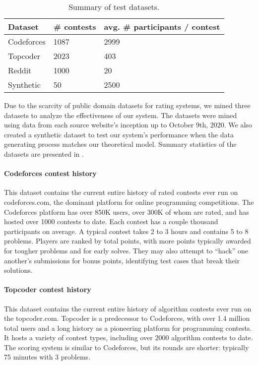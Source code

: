 \begin{table}[t]
\begin{tabular}{l|l|l}
\hline
\textbf{Dataset} & \textbf{\# contests} & \textbf{avg. \# participants / contest} \\ \hline
Codeforces       & 1087                & 2999                                     \\ %
Topcoder         & 2023                & 403                                   \\ %
Reddit           & 1000                & 20                                       \\
Synthetic        & 50                  & 2500     \\ \hline
\end{tabular}
    \caption{Summary of test datasets.}
    \label{tab:dataset-summary}
    \vspace{-1.2em}
\end{table}

Due to the scarcity of public domain datasets for rating systems, we mined three datasets to analyze the effectiveness of our system. The datasets were mined using data from each source website's inception up to October 9th, 2020. We also created a synthetic dataset to test our system's performance when the data generating process matches our theoretical model. Summary statistics of the datasets are presented in .

\paragraph{Codeforces contest history}
This dataset contains the current entire history of rated contests ever run on codeforces.com, the dominant platform for online programming competitions. The Codeforces platform has over 850K users, over 300K of whom are rated, and has hosted over 1000 contests to date. Each contest has a couple thousand participants on average. A typical contest takes 2 to 3 hours and contains 5 to 8 problems. Players are ranked by total points, with more points typically awarded for tougher problems and for early solves. They may also attempt to ``hack'' one another's submissions for bonus points, identifying test cases that break their solutions. %

\paragraph{Topcoder contest history}
This dataset contains the current entire history of algorithm contests ever run on the topcoder.com. Topcoder is a predecessor to Codeforces, with over 1.4 million total users and a long history as a pioneering platform for programming contests. It hosts a variety of contest types, including over 2000 algorithm contests to date. The scoring system is similar to Codeforces, but its rounds are shorter: typically 75 minutes with 3 problems.

